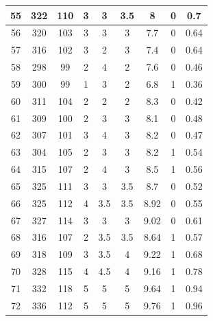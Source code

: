 \documentclass[11pt]{article}
\begin{document}
\begin{appendix}
\begin{longtable}[H]{|c|c|c|c|c|c|c|c|c|}
	55         & 322       & 110         & 3  & 3   & 3.5 & 8    & 0        & 0.7             \\ \hline
	56         & 320       & 103         & 3   & 3   & 3   & 7.7  & 0        & 0.64            \\ \hline
	57         & 316       & 102         & 3 & 2   & 3   & 7.4  & 0        & 0.64            \\ \hline
	58         & 298       & 99          & 2   & 4   & 2   & 7.6  & 0        & 0.46            \\ \hline
	59         & 300       & 99          & 1                 & 3   & 2   & 6.8  & 1        & 0.36            \\ \hline
	60         & 311       & 104         & 2                 & 2   & 2   & 8.3  & 0        & 0.42            \\ \hline
	61         & 309       & 100         & 2                 & 3   & 3   & 8.1  & 0        & 0.48            \\ \hline
	62         & 307       & 101         & 3                 & 4   & 3   & 8.2  & 0        & 0.47            \\ \hline
	63         & 304       & 105         & 2                 & 3   & 3   & 8.2  & 1        & 0.54            \\ \hline
	64         & 315       & 107         & 2                 & 4   & 3   & 8.5  & 1        & 0.56            \\ \hline
	65         & 325       & 111         & 3                 & 3   & 3.5 & 8.7  & 0        & 0.52            \\ \hline
	66         & 325       & 112         & 4                 & 3.5 & 3.5 & 8.92 & 0        & 0.55            \\ \hline
	67         & 327       & 114         & 3                 & 3   & 3   & 9.02 & 0        & 0.61            \\ \hline
	68         & 316       & 107         & 2                 & 3.5 & 3.5 & 8.64 & 1        & 0.57            \\ \hline
	69         & 318       & 109         & 3                 & 3.5 & 4   & 9.22 & 1        & 0.68            \\ \hline
	70         & 328       & 115         & 4                 & 4.5 & 4   & 9.16 & 1        & 0.78            \\ \hline
	71         & 332       & 118         & 5                 & 5   & 5   & 9.64 & 1        & 0.94            \\ \hline
	72         & 336       & 112         & 5                 & 5   & 5   & 9.76 & 1        & 0.96            \\ \hline

\end{longtable}
\end{appendix}
\end{document}
